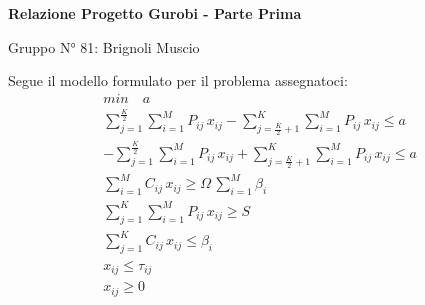\documentclass[11pt]{article}
\begin{document}
  \begin{center}
    \Large\textbf{Relazione Progetto Gurobi - Parte Prima}

    \small Gruppo N° 81: Brignoli Muscio
  \end{center}\bigskip

  Segue il modello formulato per il problema assegnatoci:
  \begin{gather*}
    min\quad a \\
    \sum_{j=1}^{\frac{K}{2}}\sum_{i=1}^{M}P_{ij}\,x_{ij}-\sum_{j=\frac{K}{2}+1}^{K}\sum_{i=1}^{M}P_{ij}\,x_{ij}\leq a \\
    -\sum_{j=1}^{\frac{K}{2}}\sum_{i=1}^{M}P_{ij}\,x_{ij}+\sum_{j=\frac{K}{2}+1}^{K}\sum_{i=1}^{M}P_{ij}\,x_{ij}\leq a \\
    \sum_{i=1}^M C_{ij}\,x_{ij}\geq \Omega\,\sum_{i=1}^M\beta_i \\
    \sum_{j=1}^{K}\sum_{i=1}^{M} P_{ij}\,x_{ij}\geq S \\
    \sum_{j=1}^K C_{ij}\,x_{ij}\leq \beta_i \\
    x_{ij}\leq \tau_{ij} \\
    x_{ij}\geq 0
  \end{gather*}
\end{document}

